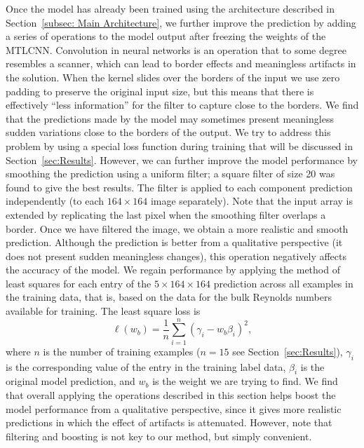 \documentclass[11pt]{article}
\numberwithin{equation}{section}
\theoremstyle{plain}
\theoremstyle{definition}
\begin{document}
Once the model has already been trained using the architecture described in Section~\ref{subsec: Main Architecture}, we further improve the prediction by adding a series of operations to the model output after freezing the weights of the MTLCNN. Convolution in neural networks is an operation that to some degree resembles a scanner, which can lead to border effects and meaningless artifacts in the solution. When the kernel slides over the borders of the input we use zero padding to preserve the original input size, but this means that  there is effectively ``less information'' for the filter to capture close to the borders. We find that the predictions made by the model may sometimes present meaningless sudden variations close to the borders of the output. We try to address this problem by using a special loss function during training that will be discussed in Section~\ref{sec:Results}. However, we can further improve the model performance by smoothing the prediction using a uniform filter; a square filter of size 20 was found to give the best results. The filter is applied to each component prediction independently (to each $164\times164$ image separately). Note that the input array is extended by replicating the last pixel when the smoothing filter overlaps a border. Once we have filtered the image, we obtain a more realistic and smooth prediction. Although the prediction is better from a qualitative perspective (it does not present sudden meaningless changes), this operation negatively affects the accuracy of the model. We regain performance by applying the method of least squares for each entry of the $5\times164\times164$ prediction across all examples in the training data, that is, based on the data for the bulk Reynolds numbers available for training. %
The least square loss is
\begin{equation}
    \ell(w_{b})=\frac{1}{n} \sum_{i=1}^{n}\left(\gamma_{i}-w_{b}\beta_{i} \right)^{2},
\end{equation}
where $n$ is the number of training examples ($n=15$ see Section~\ref{sec:Results}), $\gamma_{i}$ is the corresponding value of the entry in the training label data, $\beta_{i}$ is the original model prediction, and $w_{b}$ is the weight we are trying to find. We find that overall applying the operations described in this section helps boost the model performance from a qualitative perspective, since it gives more realistic predictions in which the effect of artifacts is attenuated. However, note that filtering and boosting is not key to our method, but simply convenient.
\end{document}
